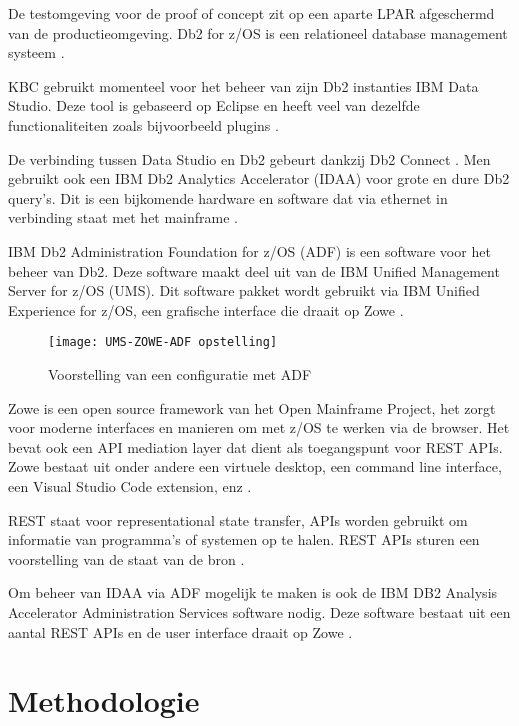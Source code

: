 De testomgeving voor de proof of concept zit op een aparte LPAR afgeschermd van de productieomgeving.
Db2 for z/OS is een relationeel database management systeem \autocite{IBM2022a}.

KBC gebruikt momenteel voor het beheer van zijn Db2 instanties IBM Data Studio. Deze tool is gebaseerd op Eclipse en heeft veel van dezelfde functionaliteiten zoals bijvoorbeeld plugins \autocite{IBM2021}.

De verbinding tussen Data Studio en Db2 gebeurt dankzij Db2 Connect \autocite{IBM2022b}. Men gebruikt ook een IBM Db2 Analytics Accelerator (IDAA) voor grote en dure Db2 query’s. Dit is een bijkomende hardware en software dat via ethernet in verbinding staat met het mainframe \autocite{Bruni2012}. 

IBM Db2 Administration Foundation for z/OS (ADF) is een software voor het beheer van Db2. Deze software maakt deel uit van de IBM Unified Management Server for z/OS (UMS). Dit software pakket wordt gebruikt via IBM Unified Experience for z/OS, een grafische interface die draait op Zowe \autocite{IBM2022c}.

\begin{figure}[h]
    \texttt{[image: UMS-ZOWE-ADF opstelling]}
    \caption{Voorstelling van een configuratie met ADF \autocite{IBM2022c}}
\end{figure}

Zowe is een open source framework van het Open Mainframe Project, het zorgt voor moderne interfaces en manieren om met z/OS te werken via de browser. Het bevat ook een API mediation layer dat dient als toegangspunt voor REST APIs. Zowe bestaat uit onder andere een virtuele desktop, een command line interface, een Visual Studio Code extension, enz \autocite{Zowe2022}.

REST staat voor representational state transfer, APIs worden gebruikt om informatie van programma’s of systemen op te halen. REST APIs sturen een voorstelling van de staat van de bron \autocite{RedHat2020}.

Om beheer van IDAA via ADF mogelijk te maken is ook de IBM DB2 Analysis Accelerator Administration Services software nodig. Deze software bestaat uit een aantal REST APIs en de user interface draait op Zowe \autocite{IBM2022d}.


\section{Methodologie}%
\label{sec:methodologie}

